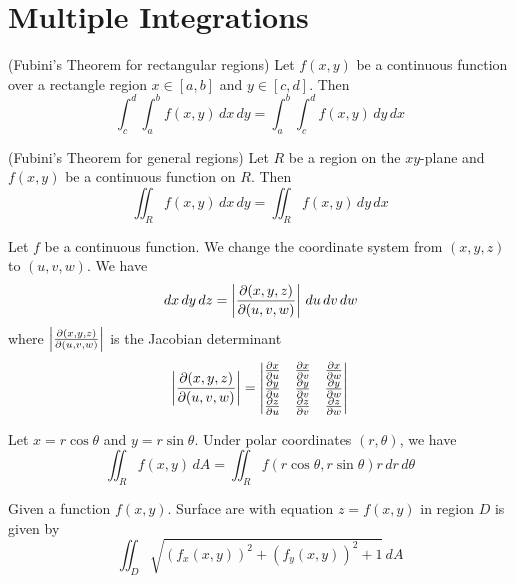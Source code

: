 \documentclass{huhtakm-template-book}
\begin{document}
\chapter{Multiple Integrations}
\begin{thm}(Fubini's Theorem for rectangular regions)
    Let $f(x,y)$ be a continuous function over a rectangle region $x\in[a,b]$ and $y\in[c,d]$. Then
    \begin{equation*}
        \int_{c}^{d}\int_{a}^{b}f(x,y)\,dx\,dy=\int_{a}^{b}\int_{c}^{d}f(x,y)\,dy\,dx
    \end{equation*}
\end{thm}
\begin{thm}(Fubini's Theorem for general regions)
    Let $R$ be a region on the $xy$-plane and $f(x,y)$ be a continuous function on $R$. Then
    \begin{equation*}
        \iint_{R}f(x,y)\,dx\,dy=\iint_{R}f(x,y)\,dy\,dx
    \end{equation*}
\end{thm}
\begin{thm}
    Let $f$ be a continuous function. We change the coordinate system from $(x,y,z)$ to $(u,v,w)$. We have
    \begin{equation*}
        \,dx\,dy\,dz=\left|{\frac{\partial(x,y,z)}{\partial(u,v,w)}}\right|\,du\,dv\,dw
    \end{equation*}
    where $\left|{\frac{\partial(x,y,z)}{\partial(u,v,w)}}\right|$ is the Jacobian determinant
    \begin{equation*}
        \left|{\frac{\partial(x,y,z)}{\partial(u,v,w)}}\right|=\begin{vmatrix}
            \pdv{x}{u} & \pdv{x}{v} & \pdv{x}{w}\\
            \pdv{y}{u} & \pdv{y}{v} & \pdv{y}{w}\\
            \pdv{z}{u} & \pdv{z}{v} & \pdv{z}{w}
        \end{vmatrix}
    \end{equation*}
\end{thm}
\begin{thm}
    Let $x=r\cos\theta$ and $y=r\sin\theta$. Under polar coordinates $(r,\theta)$, we have
    \begin{equation*}
        \iint_{R}f(x,y)\,dA=\iint_{R}f(r\cos\theta,r\sin\theta)r\,dr\,d\theta
    \end{equation*}
\end{thm}
\begin{thm}
    Given a function $f(x,y)$. Surface are with equation $z=f(x,y)$ in region $D$ is given by
    \begin{equation*}
        \iint_{D}\sqrt{(f_{x}(x,y))^{2}+(f_{y}(x,y))^{2}+1}\,dA
    \end{equation*}
\end{thm}
\end{document}
